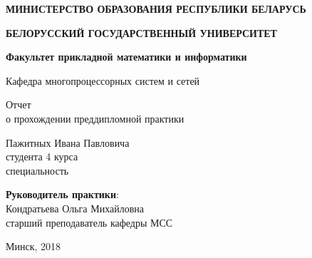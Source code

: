 \begin{titlepage}
    \begin{center}
         \textbf{МИНИСТЕРСТВО ОБРАЗОВАНИЯ РЕСПУБЛИКИ БЕЛАРУСЬ}
    \end{center}
    \begin{center}
         \textbf{БЕЛОРУССКИЙ ГОСУДАРСТВЕННЫЙ УНИВЕРСИТЕТ}
    \end{center}
    \begin{center}
         \textbf{Факультет прикладной математики и информатики}
    \end{center}
    \begin{center}
        Кафедра многопроцессорных систем и сетей
    \end{center}

    \vspace{9em}

    \begin{center}
        \textbf{\@jobtitle}
    \end{center}

    \vspace{2em}

    \begin{center}
        Отчет \\
о прохождении преддипломной практики
    \end{center}

    \vspace{4em}

    \begin{flushright}
        Пажитных Ивана Павловича\\
        студента 4 курса\\
        специальность \\
    \end{flushright}

    \vspace{1em}

    \begin{flushright}
         \textbf{Руководитель практики}:\\
        Кондратьева Ольга Михайловна\\
        старший преподаватель кафедры МСС\\
    \end{flushright}

    \vfill

    \begin{center}
        Минск, 2018
    \end{center}
\end{titlepage}
\newpage
